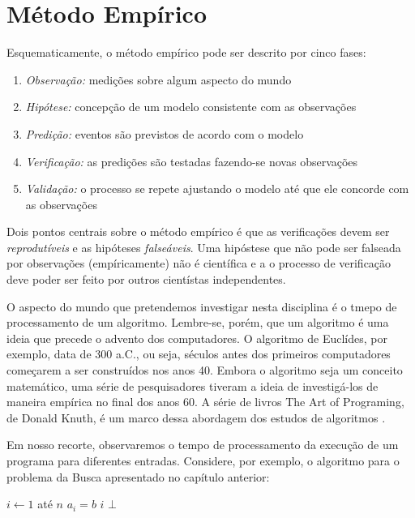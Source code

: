 \chapter{Método Empírico}

Esquematicamente, o método empírico pode ser descrito por cinco fases:
\begin{enumerate}
\item {\em Observação:} medições sobre algum aspecto do mundo
\item {\em Hipótese:} concepção de um modelo consistente com as observações
\item {\em Predição:} eventos são previstos de acordo com o modelo
\item {\em Verificação:} as predições são testadas fazendo-se novas observações
\item {\em Validação:} o processo se repete ajustando o modelo até que ele concorde com as observações
\end{enumerate}

Dois pontos centrais sobre o método empírico é que as verificações devem ser {\em reprodutíveis} e as hipóteses {\em falseáveis}.
Uma hipóstese que não pode ser falseada por observações (empíricamente) não é científica e a o processo de verificação deve poder ser feito por outros cientístas independentes.

O aspecto do mundo que pretendemos investigar nesta disciplina é o tmepo de processamento de um algoritmo.
Lembre-se, porém, que um algoritmo é uma ideia que precede o advento dos computadores.
O algoritmo de Euclídes, por exemplo, data de 300 a.C., ou seja, séculos antes dos primeiros computadores começarem a ser construídos nos anos 40.
Embora o algoritmo seja um conceito matemático, uma série de pesquisadores tiveram a ideia de investigá-los de maneira empírica no final dos anos 60.
A série de livros The Art of Programing, de Donald Knuth, é um marco dessa abordagem dos estudos de algoritmos \cite{knuth97}.

Em nosso recorte, observaremos o tempo de processamento da execução de um programa para diferentes entradas.
Considere, por exemplo, o algoritmo para o problema da Busca apresentado no capítulo anterior:

\begin{codebox}
\li \For $i \gets 1$ até $n$
\li \Do \If $a_i = b$
\li     \Then \Return $i$
        \End
    \End
\li \Return $\bot$
\End
\end{codebox}

